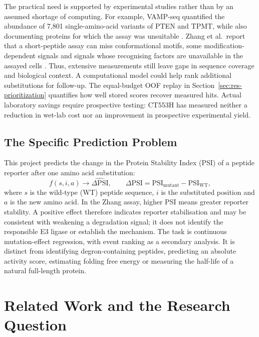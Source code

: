 The practical need is supported by experimental studies rather than by an assumed shortage of
computing. For example, VAMP-seq quantified the abundance of 7,801 single-amino-acid variants of
PTEN and TPMT, while also documenting proteins for which the assay was unsuitable
\citep{matreyek2018}. Zhang et al.\ report that a short-peptide assay can miss conformational motifs,
some modification-dependent signals and signals whose recognising factors are unavailable in the
assayed cells \citep{zhang2023}. Thus, extensive measurements still leave gaps in sequence coverage
and biological context. A computational model could help rank additional substitutions for follow-up.
The equal-budget OOF replay in Section~\ref{sec:res-prioritization} quantifies how well stored
scores recover measured hits. Actual laboratory savings require prospective testing: CT553H has
measured neither a reduction in wet-lab cost nor an improvement in prospective experimental yield.

\subsection{The Specific Prediction Problem}
This project predicts the change in the Protein Stability Index (PSI) of a peptide reporter after one
amino acid substitution:
\begin{equation}
 f(s,i,a)\longrightarrow\widehat{\Delta\mathrm{PSI}},\qquad
 \Delta\mathrm{PSI}=\mathrm{PSI}_{\mathrm{mutant}}-\mathrm{PSI}_{\mathrm{WT}},
 \label{eq:intro-task}
\end{equation}
where $s$ is the wild-type (WT) peptide sequence, $i$ is the substituted position and $a$ is the new
amino acid. In the Zhang assay, higher PSI means greater reporter stability. A positive effect therefore
indicates reporter stabilisation and may be consistent with weakening a degradation signal; it does
not identify the responsible E3 ligase or establish the mechanism. The task is continuous
mutation-effect regression, with event ranking as a secondary analysis. It is distinct from identifying
degron-containing peptides, predicting an absolute activity score, estimating folding free energy or
measuring the half-life of a natural full-length protein.

\section{Related Work and the Research Question}
